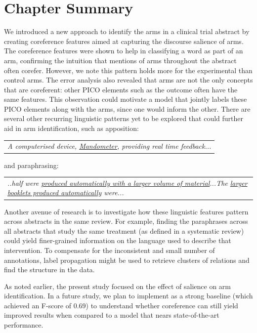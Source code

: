 \section{Chapter Summary}
We introduced a new approach to identify the arms in a clinical trial abstract by creating coreference features aimed at capturing the discourse salience of arms. The coreference features were shown to help in classifying a word as part of an arm, confirming the intuition that mentions of arms throughout the abstract often corefer. However, we note this pattern holds more for the experimental than control arms. The error analysis also revealed that arms are not the only concepts that are coreferent: other PICO elements such as the outcome often have the same features. This observation could motivate a model that jointly labels these PICO elements along with the arms, since one would inform the other. There are several other recurring linguistic patterns yet to be explored that could further aid in arm identification, such as apposition:
\vspace{-.7em}
\begin{table}[h] 
\begin{tabular}{p{7cm}}
{\small\textit{A computerised device, \uline{Mandometer}, providing real time feedback...}}
\end{tabular}
\vspace{-.5em}
\end{table}

and paraphrasing:
\vspace{-.7em}
\begin{table}[h] 
\begin{tabular}{p{7cm}}
{\small\textit{..half were \uline{produced  automatically  with  a  larger  volume  of  material}...The \uline{larger  booklets  produced  automatically} were...}}
\end{tabular}
\vspace{-.5em}
\end{table}

Another avenue of research is to investigate how these linguistic features pattern across abstracts in the same review. For example, finding the paraphrases across all abstracts that study the same treatment (as defined in a systematic review) could yield finer-grained information on the language used to describe that intervention. To compensate for the inconsistent and small number of annotations, label propagation might be used to retrieve clusters of relations and find the structure in the data.

As noted earlier, the present study focused on the effect of salience on arm identification. In a future study, we plan to implement  as a strong baseline (which achieved an F-score of 0.69) to understand whether coreference can still yield improved results when compared to a model that nears state-of-the-art performance.



